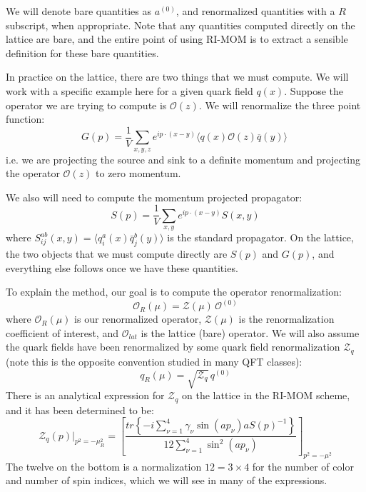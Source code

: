 \documentclass[11pt, oneside]{article}   	%
\theoremstyle{definition}
\begin{document}
We will denote bare quantities as $a^{(0)}$, and renormalized quantities with a $R$ subscript, when appropriate. 
Note that any quantities computed directly on the lattice are bare, and the entire point of using RI-MOM is to extract 
a sensible definition for these bare quantities. 

In practice on the lattice, there are two things that we must compute. We will work with a specific example here for a 
given quark field $q(x)$. Suppose the operator we are trying to compute is $\mathcal O(z)$. We will renormalize the 
three point function:
\begin{equation}
	G(p) = \frac{1}{V}\sum_{x, y, z}e^{ip\cdot (x - y)}\langle q(x)\mathcal O(z) \overline{q}(y)\rangle~
	\label{eq:green}
\end{equation}
i.e. we are projecting the source and sink to a definite momentum and projecting the operator $\mathcal O(z)$ to zero 
momentum. 

We also will need to compute the momentum projected propagator:
\begin{equation}
	S(p) = \frac{1}{V}\sum_{x, y}e^{ip\cdot(x - y)} S(x, y)
\end{equation}
where $S^{ab}_{ij}(x, y) = \langle q^a_i(x)\bar q^b_j(y)\rangle$ is the standard propagator. On the lattice, the two objects that 
we must compute directly are $S(p)$ and $G(p)$, and everything else follows once we have these quantities. 

To explain the method, our goal is to compute the operator renormalization:
\begin{equation}
	\mathcal O_R(\mu) = \mathcal Z(\mu) \,\mathcal O^{(0)}
\end{equation}
where $\mathcal O_R(\mu)$ is our renormalized operator, $\mathcal Z(\mu)$ is the renormalization coefficient of 
interest, and $\mathcal O_{lat}$ is the lattice (bare) operator. We will also assume the quark fields have been 
renormalized by some quark field renormalization $\mathcal Z_q$ (note this is the opposite convention studied in 
many QFT classes):
\begin{equation}
	q_R(\mu) = \sqrt{\mathcal Z_q}\,q^{(0)}
\end{equation}
There is an analytical expression for $\mathcal{Z}_q$ on the lattice in the RI-MOM scheme, and it has been determined 
to be:
\begin{equation}
	\mathcal Z_q(p)|_{p^2 = -\mu_R^2} = \left[\frac{tr\left\{-i\sum_{\nu = 1}^4 \gamma_\nu \sin(ap_\nu) a S(p)^{-1}\right\}}{12\sum_{\nu = 1}^4 \sin^2(ap_\nu)}\right]_{p^2 = -\mu^2}
\end{equation}
The twelve on the bottom is a normalization $12 = 3\times 4$ for the number of color and number of spin indices, which we will 
see in many of the expressions. 
\end{document}
